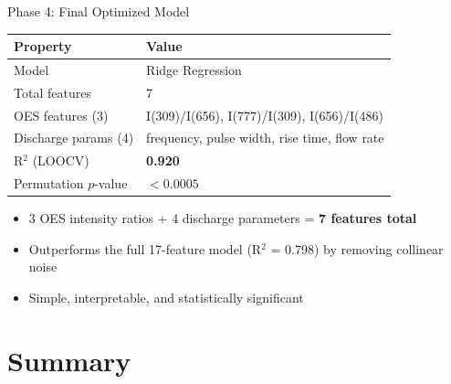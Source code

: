 \documentclass{libs/XJTLU_format}
\begin{document}
\begin{frame}{Phase 4: Final Optimized Model}
    \begin{table}[h]
        \centering
        \begin{tabular}{@{}ll@{}}
            \toprule
            \textbf{Property} & \textbf{Value} \\
            \midrule
            Model & Ridge Regression \\
            Total features & 7 \\
            OES features (3) & I(309)/I(656), I(777)/I(309), I(656)/I(486) \\
            Discharge params (4) & frequency, pulse width, rise time, flow rate \\
            R$^2$ (LOOCV) & \textbf{0.920} \\
            Permutation $p$-value & $< 0.0005$ \\
            \bottomrule
        \end{tabular}
    \end{table}
    \vspace{0.5em}
    \begin{itemize}
        \item 3 OES intensity ratios + 4 discharge parameters = \textbf{7 features total}
        \item Outperforms the full 17-feature model (R$^2$ = 0.798) by removing collinear noise
        \item Simple, interpretable, and statistically significant
    \end{itemize}
\end{frame}


\section{Summary}
\end{document}
